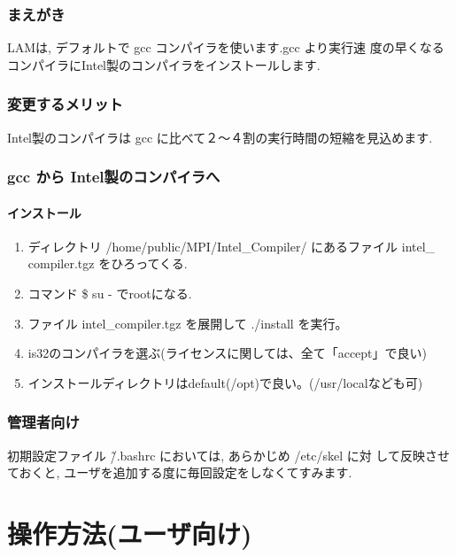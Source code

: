 \documentclass[a4paper,titlepage]{jreport}
\begin{document}
\subsection{まえがき}
LAMは, デフォルトで gcc コンパイラを使います.gcc より実行速
度の早くなるコンパイラにIntel製のコンパイラをインストールします.

\subsection{変更するメリット}

      Intel製のコンパイラは gcc に比べて２〜４割の実行時間の短縮を見込めます. 

\subsection{gcc から Intel製のコンパイラへ}

\subsubsection{インストール}

\begin{enumerate}
\item ディレクトリ /home/public/MPI/Intel\_Compiler/ にあるファイル intel\_
      compiler.tgz をひろってくる.

\item コマンド \$ su - でrootになる.

\item ファイル intel\_compiler.tgz を展開して ./install を実行。

\item is32のコンパイラを選ぶ(ライセンスに関しては、全て「accept」で良い)

\item インストールディレクトリはdefault(/opt)で良い。(/usr/localなども可)

\end{enumerate}

\subsection{管理者向け}
初期設定ファイル \~/.bashrc においては, あらかじめ /etc/skel に対
して反映させておくと, ユーザを追加する度に毎回設定をしなくてすみます.

\chapter{操作方法(ユーザ向け)\label{app:user}}
\end{document}
